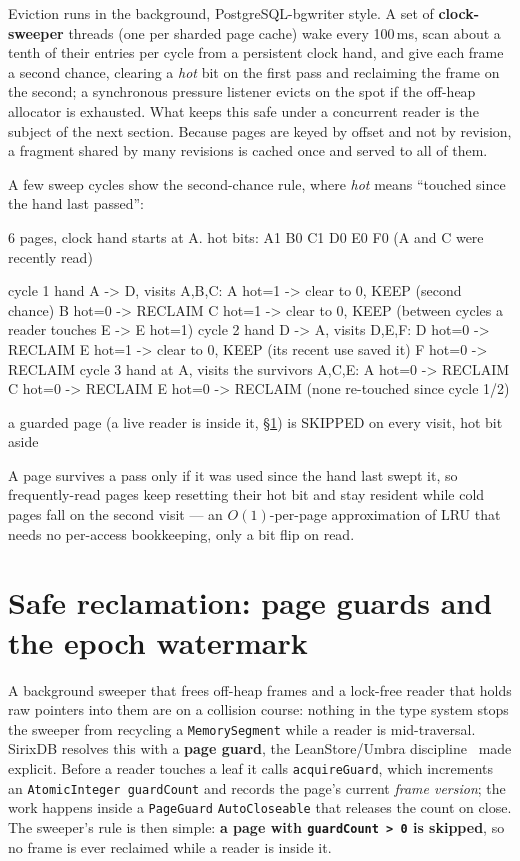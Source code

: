 \documentclass[11pt,a4paper,oneside]{report}
\newcommand{\dcap}[1]{\par\vspace{1pt}\noindent{\small\sffamily\bfseries\color{slate}#1}\par\vspace{-2pt}}
\theoremstyle{sirixthm}
\newcommand{\code}[1]{\texttt{#1}}
\begin{document}
Eviction runs in the background, PostgreSQL-bgwriter style. A set of \textbf{clock-sweeper} threads
(one per sharded page cache) wake every 100\,ms, scan about a tenth of their entries per cycle from a
persistent clock hand, and give each frame a second chance, clearing a \emph{hot} bit on the first pass
and reclaiming the frame on the second; a synchronous pressure listener evicts on the spot if the
off-heap allocator is exhausted. What keeps this safe under a concurrent reader is the subject of the
next section. Because pages are keyed by offset and not by revision, a fragment shared by many revisions
is cached once and served to all of them.

A few sweep cycles show the second-chance rule, where \emph{hot} means ``touched since the hand last
passed'':

\dcap{Clock-sweep eviction: the hot bit grants one reprieve}
\begin{diagramS}
6 pages, clock hand starts at A.   hot bits: A1 B0 C1 D0 E0 F0   (A and C were recently read)

cycle 1  hand A -> D, visits A,B,C:
   A hot=1 -> clear to 0, KEEP (second chance)   B hot=0 -> RECLAIM   C hot=1 -> clear to 0, KEEP
   (between cycles a reader touches E -> E hot=1)
cycle 2  hand D -> A, visits D,E,F:
   D hot=0 -> RECLAIM   E hot=1 -> clear to 0, KEEP (its recent use saved it)   F hot=0 -> RECLAIM
cycle 3  hand at A, visits the survivors A,C,E:
   A hot=0 -> RECLAIM   C hot=0 -> RECLAIM   E hot=0 -> RECLAIM   (none re-touched since cycle 1/2)

a guarded page (a live reader is inside it, §\ref{sec:reclaim}) is SKIPPED on every visit, hot bit aside
\end{diagramS}

\noindent A page survives a pass only if it was used since the hand last swept it, so frequently-read
pages keep resetting their hot bit and stay resident while cold pages fall on the second visit --- an
$O(1)$-per-page approximation of LRU that needs no per-access bookkeeping, only a bit flip on read.

\section{Safe reclamation: page guards and the epoch watermark}
\label{sec:reclaim}

A background sweeper that frees off-heap frames and a lock-free reader that holds raw pointers into them
are on a collision course: nothing in the type system stops the sweeper from recycling a
\code{MemorySegment} while a reader is mid-traversal. SirixDB resolves this with a \textbf{page guard},
the LeanStore/Umbra discipline~\cite{leanstore} made explicit. Before a reader touches a leaf it calls
\code{acquireGuard}, which increments an \code{AtomicInteger guardCount} and records the page's current
\emph{frame version}; the work happens inside a \code{PageGuard} \code{AutoCloseable} that releases the
count on close. The sweeper's rule is then simple: \textbf{a page with \code{guardCount > 0} is skipped},
so no frame is ever reclaimed while a reader is inside it.
\end{document}
